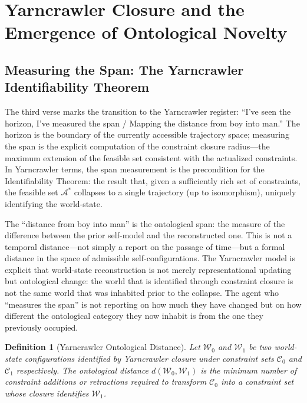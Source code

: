 \documentclass[12pt, a4paper]{article}
\newtheorem{definition}{Definition}
\begin{document}
\section{Yarncrawler Closure and the Emergence of Ontological Novelty}

\subsection{Measuring the Span: The Yarncrawler Identifiability Theorem}

The third verse marks the transition to the Yarncrawler register: ``I've seen the horizon, I've measured the span / Mapping the distance from boy into man.'' The horizon is the boundary of the currently accessible trajectory space; measuring the span is the explicit computation of the constraint closure radius---the maximum extension of the feasible set consistent with the actualized constraints. In Yarncrawler terms, the span measurement is the precondition for the Identifiability Theorem: the result that, given a sufficiently rich set of constraints, the feasible set $\mathcal{A}^*$ collapses to a single trajectory (up to isomorphism), uniquely identifying the world-state.

The ``distance from boy into man'' is the ontological span: the measure of the difference between the prior self-model and the reconstructed one. This is not a temporal distance---not simply a report on the passage of time---but a formal distance in the space of admissible self-configurations. The Yarncrawler model is explicit that world-state reconstruction is not merely representational updating but ontological change: the world that is identified through constraint closure is not the same world that was inhabited prior to the collapse. The agent who ``measures the span'' is not reporting on how much they have changed but on how different the ontological category they now inhabit is from the one they previously occupied.

\begin{definition}[Yarncrawler Ontological Distance]
Let $\mathcal{W}_0$ and $\mathcal{W}_1$ be two world-state configurations identified by Yarncrawler closure under constraint sets $\mathcal{C}_0$ and $\mathcal{C}_1$ respectively. The ontological distance $d(\mathcal{W}_0, \mathcal{W}_1)$ is the minimum number of constraint additions or retractions required to transform $\mathcal{C}_0$ into a constraint set whose closure identifies $\mathcal{W}_1$.
\end{definition}
\end{document}
